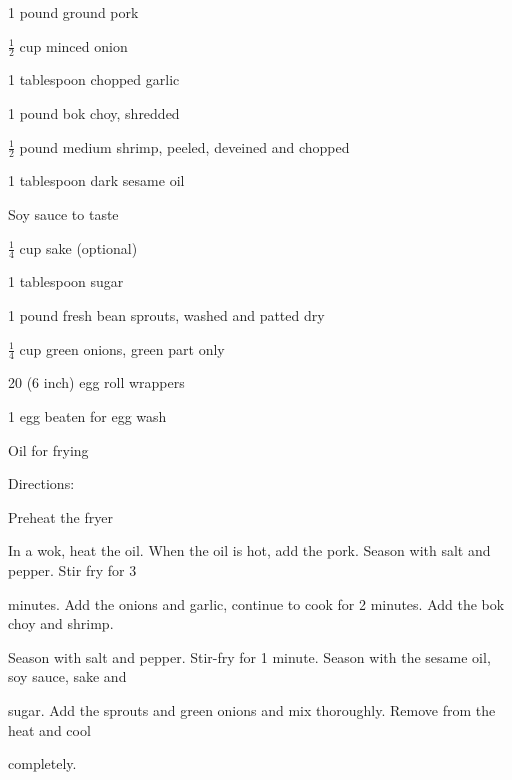 \documentclass[a4paper,portrait,12pt]{book}
\begin{document}
1 pound ground pork




$\frac{1}{2}$ cup minced onion




1 tablespoon chopped garlic




1 pound bok choy, shredded




$\frac{1}{2}$ pound medium shrimp, peeled, deveined and chopped




1 tablespoon dark sesame oil




Soy sauce to taste




$\frac{1}{4}$ cup sake (optional)




1 tablespoon sugar




1 pound fresh bean sprouts, washed and patted dry




$\frac{1}{4}$ cup green onions, green part only




20 (6 inch) egg roll wrappers




1 egg beaten for egg wash




Oil for frying




Directions:




Preheat the fryer




In a wok, heat the oil. When the oil is hot, add the pork. Season with salt and pepper. Stir fry for 3




minutes. Add the onions and garlic, continue to cook for 2 minutes. Add the bok choy and shrimp.




Season with salt and pepper. Stir-fry for 1 minute. Season with the sesame oil, soy sauce, sake and




sugar. Add the sprouts and green onions and mix thoroughly. Remove from the heat and cool




completely.
\end{document}

